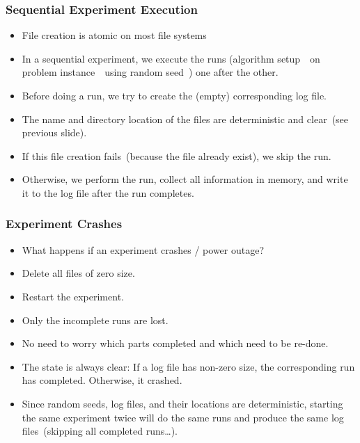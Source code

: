 \documentclass[aspectratio=169,mathserif,notheorems]{beamer}%
\begin{document}
\begin{frame}%
\frametitle{Sequential Experiment Execution}%
\begin{itemize}%
%
\item File creation is atomic on most file systems%
%
\item<4-> In a sequential experiment, we execute the runs (algorithm setup~\varAlgorithm\ on problem instance~\varInstance\ using random seed~\randomSeed) one after the other.%
%
\item<5-> Before doing a run, we try to create the (empty) corresponding log file.%
%
\item<6-> The name and directory location of the files are deterministic and clear~(see previous slide).%
%
\item<7-> If this file creation fails~(because the file already exist), we skip the run.%
%
\item<8-> Otherwise, we perform the run, collect all information in memory, and write it to the log file after the run completes.%
%
\end{itemize}%
\end{frame}%
%
\begin{frame}%
\frametitle{Experiment Crashes}%
\begin{itemize}%
\item What happens if an experiment crashes / power outage?%
%
\item<2-> Delete all files of zero size.%
%
\item<3-> Restart the experiment.%
%
\item<4-> Only the incomplete runs are lost.%
%
\item<5-> No need to worry which parts completed and which need to be re-done.%
%
\item<6-> The state is always clear: If a log file has non-zero size, the corresponding run has completed. Otherwise, it crashed.%
%
\item<7-> Since random seeds, log files, and their locations are deterministic, starting the same experiment twice will do the same runs and produce the same log files~(skipping all completed runs\dots).%
\end{itemize}%
\end{frame}%
\end{document}

